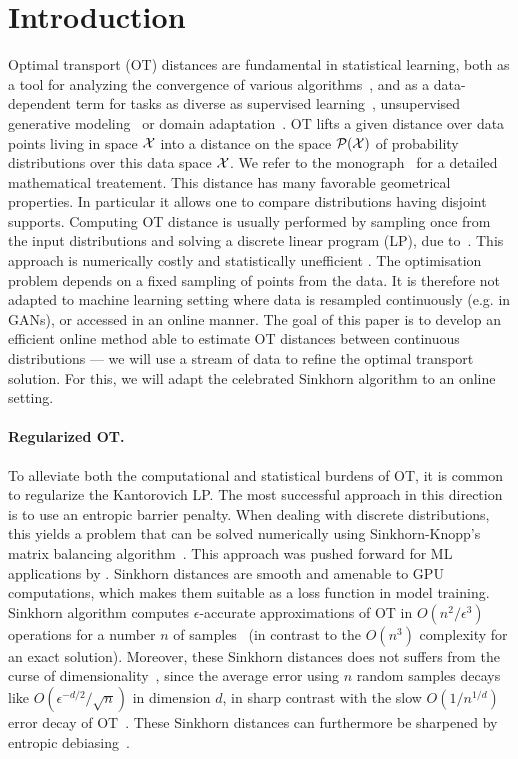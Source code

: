 \section{Introduction}

Optimal transport (OT) distances are fundamental in statistical learning, both as a tool for analyzing the convergence of various algorithms~\cite{canas2012learning,dalalyan2019user}, and as a data-dependent term for tasks as diverse as supervised learning~\cite{frogner2015learning}, unsupervised generative modeling~\cite{arjovsky2017wgan} or domain adaptation~\cite{courty2016optimal}.
%
OT lifts a given distance over data points living in space $\mathcal{X}$ into a distance
on the space $\mathcal{P}(\mathcal{X})$ of probability distributions over this data space $\mathcal{X}$. We refer to the monograph~\cite{santambrogio2015optimal} for a detailed mathematical treatement.
%
This distance has many favorable geometrical properties. In particular it allows one to compare distributions having disjoint supports. 
% 
Computing OT distance is usually performed by sampling once from the input
distributions and solving a discrete linear program (LP), due to~\citet{Kantorovich42}. This approach is numerically costly and
statistically unefficient \cite{weed2019sharp}. The optimisation problem depends
on a fixed sampling of points from the data. It is therefore not adapted to
machine learning setting where data is resampled continuously (e.g. in GANs), or
accessed in an online manner. The goal of this paper is to develop an efficient
online method able to estimate OT distances between continuous distributions ---
we will use a stream of data to refine the optimal transport solution. For this, we will
adapt the celebrated Sinkhorn algorithm to an online setting.
  


\paragraph{Regularized OT.}

To alleviate both the computational and statistical burdens of OT, it is common
to regularize the Kantorovich LP.
%
The most successful approach in this direction is to use an entropic barrier penalty. 
%
When dealing with discrete distributions, this yields a problem that can be solved
numerically using Sinkhorn-Knopp's matrix balancing
algorithm~\cite{Sinkhorn64,sinkhorn1967concerning}.
%
This approach was pushed forward for ML applications
by \citet{cuturi2013sinkhorn}. Sinkhorn distances are smooth and amenable to GPU computations, which makes them suitable as a loss function in model training.
%
Sinkhorn algorithm computes $\epsilon$-accurate approximations of OT in
$O(n^2/\epsilon^3)$ operations for a number $n$ of samples~\cite{altschuler2017near} (in
contrast to the $O(n^3)$ complexity for an exact solution). Moreover, these Sinkhorn distances does not suffers from the curse of dimensionality~\cite{2019-Genevay-aistats}, since the average error using $n$ random samples decays like $O(\epsilon^{-d/2}/\sqrt{n})$ in dimension $d$, in sharp contrast with the slow $O(1/n^{1/d})$ error decay of OT~\cite{weed2019sharp}. These Sinkhorn distances can furthermore be sharpened by entropic debiasing~\cite{2019-Feydy-aistats}.  

